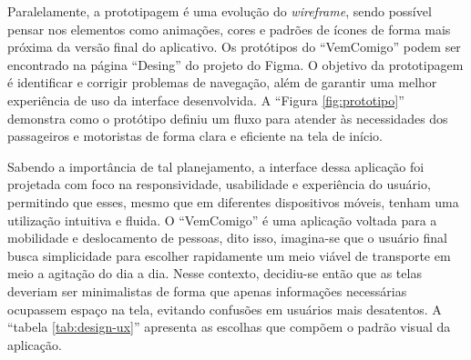 Paralelamente, a prototipagem é uma evolução do \textit{wireframe}, sendo possível pensar nos elementos como animações, cores e padrões de ícones de forma mais próxima da versão final do aplicativo. Os protótipos do ``VemComigo'' podem ser encontrado na página ``Desing'' do projeto do Figma. O objetivo da prototipagem é identificar e corrigir problemas de navegação, além de garantir uma melhor experiência de uso da interface desenvolvida. A ``Figura \ref{fig:prototipo}'' demonstra como o protótipo definiu um fluxo para atender às necessidades dos passageiros e motoristas de forma clara e eficiente na tela de início.

Sabendo a importância de tal planejamento, a interface dessa aplicação foi projetada com foco na responsividade, usabilidade e experiência do usuário, permitindo que esses, mesmo que em diferentes dispositivos móveis, tenham uma utilização intuitiva e fluida. O ``VemComigo'' é uma aplicação voltada para a mobilidade e deslocamento de pessoas, dito isso, imagina-se que o usuário final busca simplicidade para escolher rapidamente um meio viável de transporte em meio a agitação do dia a dia. Nesse contexto, decidiu-se então que as telas deveriam ser minimalistas de forma que apenas informações necessárias ocupassem espaço na tela, evitando confusões em usuários mais desatentos. A ``tabela \ref{tab:design-ux}'' apresenta as escolhas que compõem o padrão visual da aplicação.

